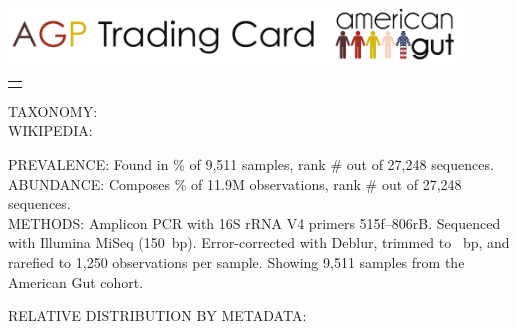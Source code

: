 \documentclass[9pt]{amsart}
\begin{document}

\begin{myboxA}

\begin{center}
\includegraphics[width=12cm]{../agp_header.pdf}
\end{center}

\hspace{1.2cm}
\begin{tabular}{L{5in}}
\texttt{\sequence{}}
\end{tabular}

\noindent
\begin{minipage}[t]{.48\textwidth}
\raggedright
\begin{hangparas}{1em}{1}
    TAXONOMY:   \taxonomyGG{}
\\ \vspace{2mm}
    WIKIPEDIA:  \wikipedia{}
\end{hangparas}
\end{minipage}%
\hfill
\begin{minipage}[t]{.48\textwidth}
\raggedright
\begin{hangparas}{1em}{1}
    PREVALENCE: Found in \prevalencePercent{}\% of 9,511 samples, %
                rank \#\prevalenceRank{} out of 27,248 sequences. %
\\ \vspace{2mm}
    ABUNDANCE:  Composes \abundancePercent{}\% of 11.9M observations,
                rank \#\abundanceRank{} out of 27,248 sequences. %
\\ \vspace{2mm}
    METHODS:    Amplicon PCR with 16S rRNA V4 primers 515f--806rB.
    			Sequenced with Illumina MiSeq (150~bp).
                Error-corrected with Deblur, trimmed to \trimLength{}~bp, and
                rarefied to 1,250 observations per sample. %
                Showing 9,511 samples from the American Gut cohort. %
\end{hangparas}
\end{minipage}

RELATIVE DISTRIBUTION BY METADATA:


\end{myboxA}
\end{document}
